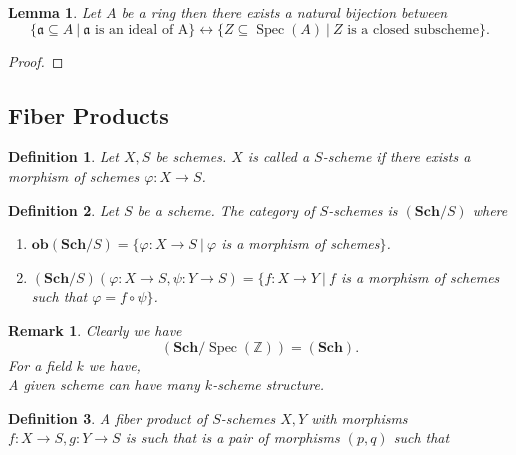 \documentclass{article}
\newtheorem{definition}{Definition}[section]
\newtheorem{lemma}{Lemma}[section]
\newtheorem{remark}{Remark}[section]
\numberwithin{equation}{section}
\DeclareMathOperator{\Spec}{Spec}
\begin{document}
\begin{lemma}
Let $A$ be a ring then there exists a natural bijection between 
\begin{equation*}
\{\mathfrak{a}\subseteq A\:|\:\mathfrak{a}\text{ is an ideal of A}\}\leftrightarrow\{Z\subseteq\Spec(A)\:|\:Z \text{ is a closed subscheme}\}.
\end{equation*}
\end{lemma}

\begin{proof}
\end{proof}

\subsection{Fiber Products}

\begin{definition}
Let $X,S$ be schemes. $X$ is called a $S$-scheme if there exists a morphism of schemes $\varphi:X\to S$. 
\end{definition}

\begin{definition}
Let $S$ be a scheme. The category of $S$-schemes is $(\mathbf{Sch}/S)$ where
\begin{enumerate}
\item $\mathbf{ob}(\mathbf{Sch}/S) = \{\varphi:X\to S\:|\: \varphi$ is a morphism of schemes$\}$.
\item $(\mathbf{Sch}/S)(\varphi:X\to S,\psi:Y\to S) = \{f:X\to Y\:|\: f$ is a morphism of schemes such that $\varphi=f\circ\psi\}$. 
\end{enumerate}
\end{definition}

\begin{remark}
Clearly we have
\begin{equation*}
(\mathbf{Sch}/\Spec(\mathbb{Z}))=(\mathbf{Sch}).
\end{equation*}
For a field $k$ we have,
\begin{equation*}
\end{equation*}
A given scheme can have many $k$-scheme structure.%
\end{remark}

\begin{definition}
A fiber product of $S$-schemes $X,Y$ with morphisms $f:X\to S,g:Y\to S$ is such that is a pair of morphisms $(p,q)$ such that
\begin{equation*}
\end{equation*}
\end{definition}
\end{document}
